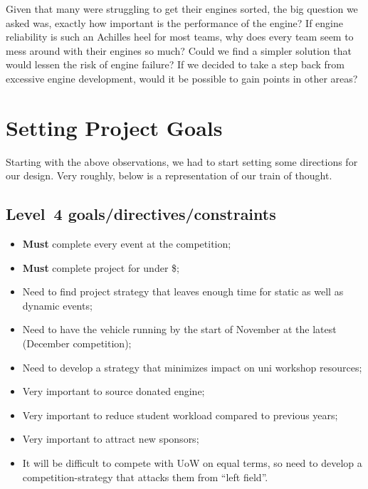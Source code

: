 \documentclass[10pt, a4paper, article, oneside, twocolumn, final]{memoir}
\begin{document}
Given that many were struggling to get their engines sorted, the big question we asked was, exactly how important is the performance of the engine? If engine reliability is such an Achilles heel for most teams, why does every team seem to mess around with their engines so much? Could we find a simpler solution that would lessen the risk of engine failure? If we decided to take a step back from excessive engine development, would it be possible to gain points in other areas? 

\section*{Setting Project Goals}

Starting with the above observations, we had to start setting some directions for our design. Very roughly, below is a representation of our train of thought. 

\subsection*{Level~4 goals/\allowbreak directives/\allowbreak constraints}
\begin{itemize}
    \item \textbf{Must} complete every event at the competition; 
    \item \textbf{Must}  complete project for under \si{\$}; 
    \item Need to find project strategy that leaves enough time for static as well as dynamic events; 
    \item Need to have the vehicle running by the start of November at the latest (December competition); 
    \item Need to develop a strategy that minimizes impact on uni workshop resources; 
    \item Very important to source donated engine; 
    \item Very important to reduce student workload compared to previous years; 
    \item Very important to attract new sponsors; 
    \item It will be difficult to compete with UoW on equal terms, so need to develop a competition-strategy that attacks them from “left field”. 
\end{itemize}
\end{document}
